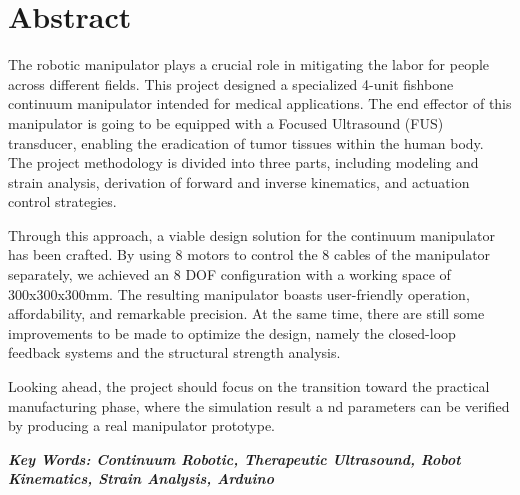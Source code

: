 \section*{Abstract} 
The robotic manipulator plays a crucial role in mitigating the labor for people across different fields. This project designed a 
specialized 4-unit fishbone continuum manipulator intended for medical applications. The end effector of this manipulator is 
going to be equipped with a Focused Ultrasound (FUS) transducer, enabling the eradication of tumor tissues within the human body. 
The project methodology is divided into three parts, including modeling and strain analysis, derivation of forward and inverse 
kinematics, and actuation control strategies. 

Through this approach, a viable design solution for the continuum manipulator has been crafted. By using 8 motors to control 
the 8 cables of the manipulator separately, we achieved an 8 DOF configuration with a working space of 300x300x300mm. The 
resulting manipulator boasts user-friendly operation, affordability, and remarkable precision. At the same time, there are 
still some improvements to be made to optimize the design, namely the closed-loop feedback systems and the structural strength 
analysis. 

Looking ahead, the project should focus on the transition toward the practical manufacturing phase, where the simulation result a
nd parameters can be verified by producing a real manipulator prototype.


\vfill


\textbf{\emph{Key Words: Continuum Robotic, Therapeutic Ultrasound, Robot Kinematics, Strain Analysis, Arduino}}
\vspace{0.8cm}
\setcounter{page}{1}
\newpage